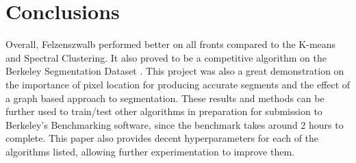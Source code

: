 \documentclass[12pt]{extarticle}
\begin{document}
\section{Conclusions}

  Overall, Felzenszwalb performed better on all fronts compared to the K-means
  and Spectral Clustering. It also proved to be a competitive algorithm on
  the Berkeley Segmentation Dataset \cite{dataset}. This project was also 
  a great demonstration on the importance of pixel location for producing
  accurate segments and the effect of a graph based approach to segmentation. 
  These results and methods can be further used to train/test other algorithms
  in preparation for submission to Berkeley's Benchmarking software, since 
  the benchmark takes around 2 hours to complete. This paper also provides 
  decent hyperparameters for each of the algorithms listed, allowing further
  experimentation to improve them.

  \hfill



\end{document}
